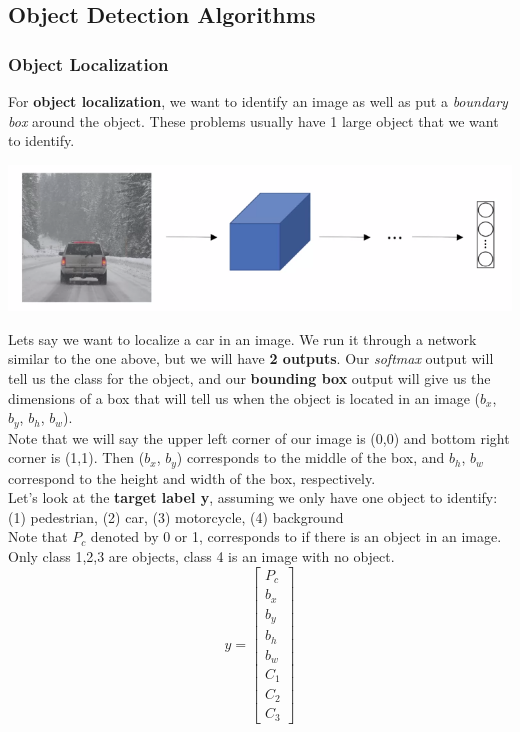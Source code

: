 \documentclass[11pt, a4paper]{article}
\begin{document}
\begin{spacing}{1.1}
	\subsection{Object Detection Algorithms}
	\subsubsection{Object Localization}
	For \textbf{object localization}, we want to identify an image as well as put a \textit{boundary box} around the object. These problems usually have 1 large object that we want to identify.
	\begin{center}	\includegraphics[scale=.6]{obj_loc}	\end{center}
	Lets say we want to localize a car in an image. We run it through a network similar to the one above, but we will have \textbf{2 outputs}. Our \textit{softmax} output will tell us the class for the object, and our \textbf{bounding box} output will give us the dimensions of a box that will tell us when the object is located in an image ($b_x$, $b_y$, $b_h$, $b_w$). \vspace*{1mm}\\
	Note that we will say the upper left corner of our image is (0,0) and bottom right corner is (1,1). Then ($b_x$, $b_y$) corresponds to the middle of the box, and $b_h$, $b_w$ correspond to the height and width of the box, respectively. \vspace*{2mm}\\
	Let's look at the \textbf{target label y}, assuming we only have one object to identify: \\
	(1) pedestrian,	(2) car, (3) motorcycle, (4) background \vspace*{1mm}\\
	Note that $P_c$ denoted by 0 or 1, corresponds to if there is an object in an image. Only class 1,2,3 are objects, class 4 is an image with no object. $$ y = \begin{bmatrix}	P_c \\ b_x \\ b_y \\ b_h \\ b_w \\ C_1 \\ C_2 \\ C_3 \end{bmatrix} $$

\end{spacing}
\end{document}
